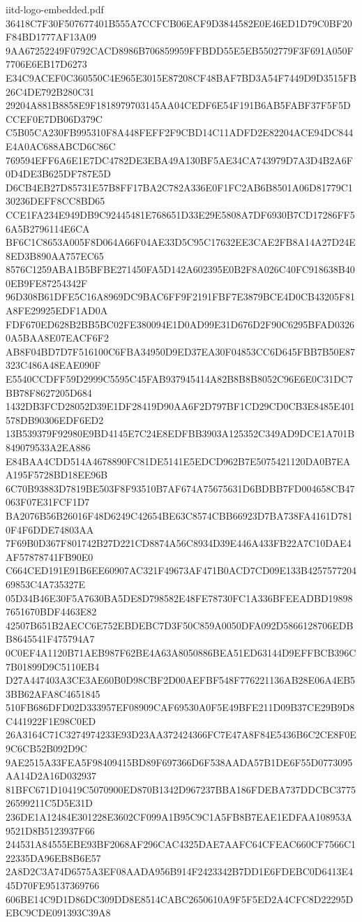 \begin{filecontents*}[overwrite]{iitd-logo-embedded.pdf}
36418C7F30F507677401B555A7CCFCB06EAF9D3844582E0E46ED1D79C0BF20F84BD1777AF13A09
9AA67252249F0792CACD8986B706859959FFBDD55E5EB5502779F3F691A050F7706E6EB17D6273
E34C9ACEF0C360550C4E965E3015E87208CF48BAF7BD3A54F7449D9D3515FB26C4DE792B280C31
29204A881B8858E9F1818979703145AA04CEDF6E54F191B6AB5FABF37F5F5DCCEF0E7DB06D379C
C5B05CA230FB995310F8A448FEFF2F9CBD14C11ADFD2E82204ACE94DC844E4A0AC688ABCD6C86C
769594EFF6A6E1E7DC4782DE3EBA49A130BF5AE34CA743979D7A3D4B2A6F0D4DE3B625DF787E5D
D6CB4EB27D85731E57B8FF17BA2C782A336E0F1FC2AB6B8501A06D81779C130236DEFF8CC8BD65
CCE1FA234E949DB9C92445481E768651D33E29E5808A7DF6930B7CD17286FF56A5B2796114E6CA
BF6C1C8653A005F8D064A66F04AE33D5C95C17632EE3CAE2FB8A14A27D24E8ED3B890AA757EC65
8576C1259ABA1B5BFBE271450FA5D142A602395E0B2F8A026C40FC918638B400EB9FE87254342F
96D308B61DFE5C16A8969DC9BAC6FF9F2191FBF7E3879BCE4D0CB43205F81A8FE29925EDF1AD0A
FDF670ED628B2BB5BC02FE380094E1D0AD99E31D676D2F90C6295BFAD03260A5BAA8E07EACF6F2
AB8F04BD7D7F516100C6FBA34950D9ED37EA30F04853CC6D645FBB7B50E87323C486A48EAE090F
E5540CCDFF59D2999C5595C45FAB937945414A82B8B8B8052C96E6E0C31DC7BB78F8627205D684
1432DB3FCD28052D39E1DF28419D90AA6F2D797BF1CD29CD0CB3E8485E401578DB90306EDF6ED2
13B539379F92980E9BD4145E7C24E8EDFBB3903A125352C349AD9DCE1A701B849079533A2EA886
E84BAA4CDD514A4678890FC81DE5141E5EDCD962B7E5075421120DA0B7EAA195F5728BD18EE96B
6C70B93883D7819BE503F8F93510B7AF674A75675631D6BDBB7FD004658CB47063F07E31FCF1D7
BA2076B56B26016F48D6249C42654BE63C8574CBB66923D7BA738FA4161D7810F4F6DDE74803AA
7F69B0D367F801742B27D221CD8874A56C8934D39E446A433FB22A7C10DAE4AF57878741FB90E0
C664CED191E91B6EE60907AC321F49673AF471B0ACD7CD09E133B425757720469853C4A735327E
05D34B46E30F5A7630BA5DE8D798582E48FE78730FC1A336BFEEADBD198987651670BDF4463E82
42507B651B2AECC6E752EBDEBC7D3F50C859A0050DFA092D5866128706EDBB8645541F475794A7
0C0EF4A1120B71AEB987F62BE4A63A8050886BEA51ED63144D9EFFBCB396C7B01899D9C5110EB4
D27A447403A3CE3AE60B0D98CBF2D00AEFBF548F776221136AB28E06A4EB53BB62AFA8C4651845
510FB686DFD02D333957EF08909CAF69530A0F5E49BFE211D09B37CE29B9D8C441922F1E98C0ED
26A3164C71C3274974233E93D23AA372424366FC7E47A8F84E5436B6C2CE8F0E9C6CB52B092D9C
9AE2515A33FEA5F98409415BD89F697366D6F538AADA57B1DE6F55D0773095AA14D2A16D032937
81BFC671D10419C5070900ED870B1342D967237BBA186FDEBA737DDCBC377526599211C5D5E31D
236DE1A12484E301228E3602CF099A1B95C9C1A5FB8B7EAE1EDFAA108953A9521D8B5123937F66
244531A84555EBE93BF2068AF296CAC4325DAE7AAFC64CFEAC660CF7566C122335DA96EB8B6E57
2A8D2C3A74D6575A3EF08AADA956B914F2423342B7DD1E6FDEBC0D6413E445D70FE95137369766
606BE14C9D1D86DC309DD8E8514CABC2650610A9F5F5ED2A4CFC8D22295DEBC9CDE091393C39A8

\end{filecontents*}
